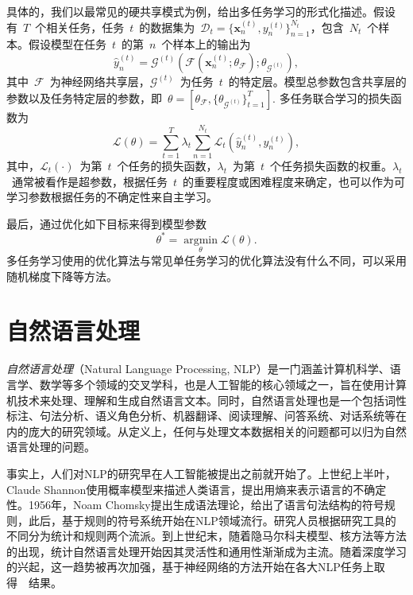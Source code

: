 具体的，我们以最常见的硬共享模式为例，给出多任务学习的形式化描述。假设有~$T$~个相关任务，任务~$t$~的数据集为~$\mathcal{D}_t = \lbrace \mathbf{x}_n^{(t)}, y_n^{(t)} \rbrace_{n=1}^{N_t}$，包含~$N_t$~个样本。假设模型在任务~$t$~的第~$n$~个样本上的输出为
\begin{equation}
	\hat{y}_n^{(t)} = \mathcal{G}^{(t)}(\mathcal{F}(\mathbf{x}_n^{(t)}; \theta_\mathcal{F}) ; \theta_{\mathcal{G}^{(t)}}),
\end{equation}
其中~$\mathcal{F}$~为神经网络共享层，$\mathcal{G}^{(t)}$~为任务~$t$~的特定层。模型总参数包含共享层的参数以及任务特定层的参数，即~$\theta = [\theta_\mathcal{F}, \{ \theta_{\mathcal{G}^{(t)}}\}_{t=1}^T]$. 多任务联合学习的损失函数为
\begin{equation}
	\mathcal{L}(\theta) = \sum_{t=1}^T\lambda_t\sum_{n=1}^{N_t}\mathcal{L}_t(\hat{y}_n^{(t)}, y_n^{(t)}),
\end{equation}
其中，$\mathcal{L}_t(\cdot)$~为第~$t$~个任务的损失函数，$\lambda_t$~为第~$t$~个任务损失函数的权重。$\lambda_t$~通常被看作是超参数，根据任务~$t$~的重要程度或困难程度来确定，也可以作为可学习参数根据任务的不确定性来自主学习\cite{DBLP:conf/cvpr/KendallGC18}。

最后，通过优化如下目标来得到模型参数
\begin{equation}
	\theta ^* = \mathop{\arg\min}\limits_{\theta} \mathcal{L}(\theta).
\end{equation}
多任务学习使用的优化算法与常见单任务学习的优化算法没有什么不同，可以采用随机梯度下降等方法。
\section{自然语言处理}
\label{sec:nlp}

\emph{自然语言处理}（Natural Language Processing, NLP）是一门涵盖计算机科学、语言学、数学等多个领域的交叉学科，也是人工智能的核心领域之一，旨在使用计算机技术来处理、理解和生成自然语言文本。同时，自然语言处理也是一个包括词性标注、句法分析、语义角色分析、机器翻译、阅读理解、问答系统、对话系统等在内的庞大的研究领域。从定义上，任何与处理文本数据相关的问题都可以归为自然语言处理的问题。

事实上，人们对NLP的研究早在人工智能被提出之前就开始了。上世纪上半叶，Claude Shannon使用概率模型来描述人类语言，提出用熵来表示语言的不确定性。1956年，Noam Chomsky提出生成语法理论，给出了语言句法结构的符号规则，此后，基于规则的符号系统开始在NLP领域流行。研究人员根据研究工具的不同分为统计和规则两个流派。到上世纪末，随着隐马尔科夫模型、核方法等方法的出现，统计自然语言处理开始因其灵活性和通用性渐渐成为主流。随着深度学习的兴起，这一趋势被再次加强，基于神经网络的方法开始在各大NLP任务上取得~\sArt~结果。

